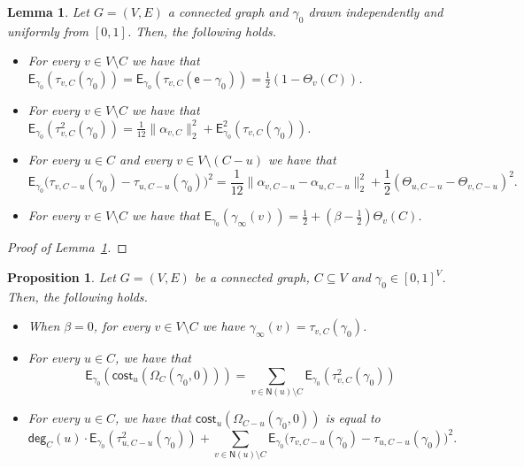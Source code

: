 \documentclass[letterpaper,11pt]{article}
\newcommand{\EE}{\mathsf{E}}
\newcommand{\nsf}{\mathsf{N}}
\newcommand{\cost}{\mathsf{cost}}
\newcommand{\degsf}{\mathsf{deg}}
\newtheorem{lemma}{Lemma}
\newtheorem{proposition}{Proposition}
\begin{document}
\begin{lemma}
\label{lem:expected-limit}
Let $G=(V,E)$ a connected graph and $\gamma_0$ drawn independently and uniformly from $[0,1]$. 
Then, the following holds.
\begin{itemize}
	\item[$(a)$] For every $v\in V\setminus C$ we have that $\EE_{\gamma_0}(\tau_{v,C}(\gamma_0))=\EE_{\gamma_0}(\tau_{v,C}(\mathsf{e}-\gamma_0))=\frac{1}{2}(1-\Theta_v(C))$.
	\item[$(b)$] For every $v\in V\setminus C$ we have that $\EE_{\gamma_0}(\tau^2_{v,C}(\gamma_0))=\frac{1}{12}\|\alpha_{v,C}\|_2^2+\EE^2_{\gamma_0}(\tau_{v,C}(\gamma_0))$.
	\item[$(c)$] For every $u\in C$ and every $v\in V\setminus (C-u)$ we have that 
	\begin{equation*}
	\EE_{\gamma_0}\Big(\tau_{v,C-u}(\gamma_0)-\tau_{u,C-u}(\gamma_0)\Big)^2=\frac{1}{12}\|\alpha_{v,C-u}-\alpha_{u,C-u}\|_2^2+\frac{1}{2}(\Theta_{u,C-u}-\Theta_{v,C-u})^2.
	\end{equation*}
	\item[$(d)$] For every $v\in V\setminus C$ we have that $\EE_{\gamma_0}(\gamma_{\infty}(v))=\frac{1}{2}+\left(\beta-\frac{1}{2}\right)\Theta_v(C)$.
\end{itemize}
\end{lemma}

\begin{proof}[Proof of Lemma~\ref{lem:expected-limit}]

\end{proof}

\begin{proposition}
\label{prop:properties}
Let $G=(V,E)$ be a connected graph, $C\subseteq V$ and $\gamma_0\in [0,1]^V$.
Then, the following holds.
\begin{itemize}
	\item[$(a)$] When $\beta=0$, for every $v\in V\setminus C$ we have $\gamma_{\infty}(v)=\tau_{v,C}(\gamma_0)$.
	\item[$(b)$]  For every $u\in C$, we have that 
\begin{equation*}
\EE_{\gamma_0}(\cost_u(\Omega_C(\gamma_0,0)))=\sum_{v\in \nsf(u)\setminus C}\EE_{\gamma_0}(\tau^2_{v,C}(\gamma_0))
\end{equation*}
	\item[$(c)$]  For every $u\in C$, we have that $\cost_u(\Omega_{C-u}(\gamma_0,0))$ is equal to
\begin{equation*}
\degsf_C(u)\cdot \EE_{\gamma_0}(\tau^2_{u,C-u}(\gamma_0))+\sum_{v\in \nsf(u)\setminus C}\EE_{\gamma_0}\Big(\tau_{v,C-u}(\gamma_0)-\tau_{u,C-u}(\gamma_0)\Big)^2.
\end{equation*}
\end{itemize}
\end{proposition}
\end{document}
